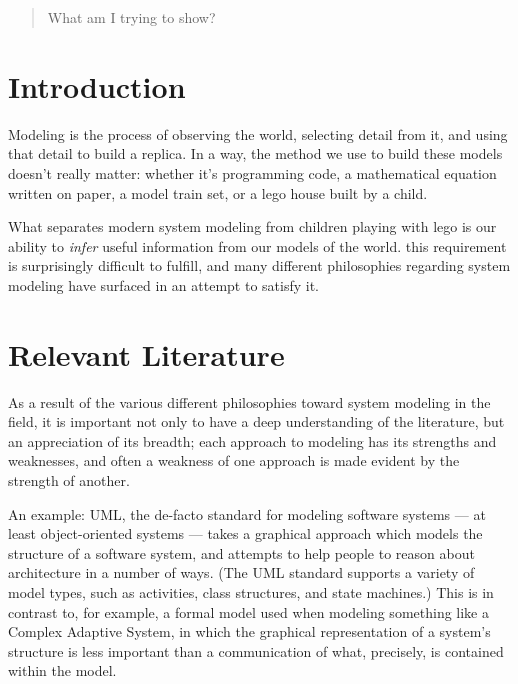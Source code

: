 \documentclass[draft,12pt]{article}
\begin{document}
\maketitle

\begin{abstract}
  What am I trying to show?
  
\end{abstract}

\section{Introduction}
\label{sec:introduction}
Modeling is the process of observing the world, selecting detail from it,
and using that detail to build a replica. In a way, the method we use to build
these models doesn't really matter: whether it's programming code, a
mathematical equation written on paper, a model train set, or a lego house built
by a child.

What separates modern system modeling from children playing with lego is our
ability to \emph{infer} useful information from our models of the world. this
requirement is surprisingly difficult to fulfill, and many different
philosophies regarding system modeling have surfaced in an attempt to satisfy it.


\section{Relevant Literature}


As a result of the various different philosophies toward system modeling in the
field, it is important not only to have a deep understanding of the literature,
but an appreciation of its breadth; each approach to modeling has its strengths
and weaknesses, and often a weakness of one approach is made evident by the
strength of another.\par

An example: UML\citep{rumbaugh2017unified}, the de-facto standard for modeling
software systems --- at least object-oriented systems --- takes a graphical
approach which models the structure of a software system, and attempts to help
people to reason about architecture in a number of ways. (The UML standard
supports a variety of model types, such as activities, class structures, and
state machines.) This is in contrast to, for example, a formal model used when
modeling something like a Complex Adaptive
System\citep{groscomplex,petri1962kommunikation}, in which the graphical
representation of a system's structure is less important than a communication of
what, precisely, is contained within the model.
\end{document}
